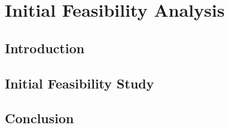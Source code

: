 \chapter{Initial Feasibility Analysis}
\begin{spacing}{1.5}
\setlength{\parskip}{0.3in}

\section{Introduction}

\section{Initial Feasibility Study}

\section{Conclusion}

\end{spacing}